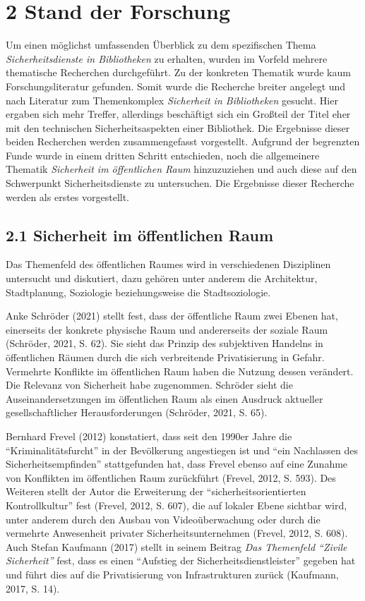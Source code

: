 \documentclass[a4paper,
fontsize=11pt,
oneside,
numbers=noperiodatend,
parskip=half-,
bibliography=totoc,
final
]{scrartcl}
\begin{document}
\hypertarget{stand-der-forschung}{%
\section{2 Stand der Forschung}\label{stand-der-forschung}}

Um einen möglichst umfassenden Überblick zu dem spezifischen Thema
\emph{Sicherheitsdienste in Bibliotheken} zu erhalten, wurden im Vorfeld
mehrere thematische Recherchen durchgeführt. Zu der konkreten Thematik
wurde kaum Forschungsliteratur gefunden. Somit wurde die Recherche
breiter angelegt und nach Literatur zum Themenkomplex \emph{Sicherheit
in Bibliotheken} gesucht. Hier ergaben sich mehr Treffer, allerdings
beschäftigt sich ein Großteil der Titel eher mit den technischen
Sicherheitsaspekten einer Bibliothek. Die Ergebnisse dieser beiden
Recherchen werden zusammengefasst vorgestellt. Aufgrund der begrenzten
Funde wurde in einem dritten Schritt entschieden, noch die allgemeinere
Thematik \emph{Sicherheit im öffentlichen Raum} hinzuzuziehen und auch
diese auf den Schwerpunkt Sicherheitsdienste zu untersuchen. Die
Ergebnisse dieser Recherche werden als erstes vorgestellt.

\hypertarget{sicherheit-im-uxf6ffentlichen-raum}{%
\subsection{2.1 Sicherheit im öffentlichen
Raum}\label{sicherheit-im-uxf6ffentlichen-raum}}

Das Themenfeld des öffentlichen Raumes wird in verschiedenen Disziplinen
untersucht und diskutiert, dazu gehören unter anderem die Architektur,
Stadtplanung, Soziologie beziehungsweise die Stadtsoziologie.

Anke Schröder (2021) stellt fest, dass der öffentliche Raum zwei Ebenen
hat, einerseits der konkrete physische Raum und andererseits der soziale
Raum (Schröder, 2021, S. 62). Sie sieht das Prinzip des subjektiven
Handelns in öffentlichen Räumen durch die sich verbreitende
Privatisierung in Gefahr. Vermehrte Konflikte im öffentlichen Raum haben
die Nutzung dessen verändert. Die Relevanz von Sicherheit habe
zugenommen. Schröder sieht die Auseinandersetzungen im öffentlichen Raum
als einen Ausdruck aktueller gesellschaftlicher Herausforderungen
(Schröder, 2021, S. 65).

Bernhard Frevel (2012) konstatiert, dass seit den 1990er Jahre die
\enquote{Kriminalitätsfurcht} in der Bevölkerung angestiegen ist und
\enquote{ein Nachlassen des Sicherheitsempfinden} stattgefunden hat,
dass Frevel ebenso auf eine Zunahme von Konflikten im öffentlichen Raum
zurückführt (Frevel, 2012, S. 593). Des Weiteren stellt der Autor die
Erweiterung der \enquote{sicherheitsorientierten Kontrollkultur} fest
(Frevel, 2012, S. 607), die auf lokaler Ebene sichtbar wird, unter
anderem durch den Ausbau von Videoüberwachung oder durch die vermehrte
Anwesenheit privater Sicherheitsunternehmen (Frevel, 2012, S. 608). Auch
Stefan Kaufmann (2017) stellt in seinem Beitrag \emph{Das Themenfeld
\enquote{Zivile Sicherheit}} fest, dass es einen \enquote{Aufstieg der
Sicherheitsdienstleister} gegeben hat und führt dies auf die
Privatisierung von Infrastrukturen zurück (Kaufmann, 2017, S. 14).
\end{document}
